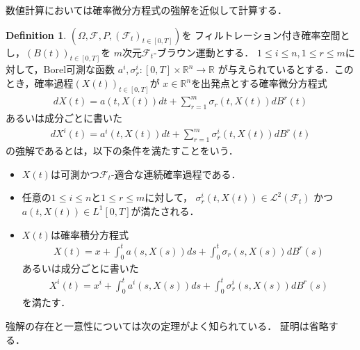 \documentclass[dvipdfmx,autodetect-engine]{jsarticle}
\theoremstyle{remark}
\theoremstyle{definition}
\newtheorem{definition}{Definition}[section]
\newcommand{\R}{\mathbb{R}}
\begin{document}
数値計算においては確率微分方程式の強解を近似して計算する．
\begin{definition}\label{strong_solution}
    $(\Omega,\mathcal{F},P,(\mathcal{F}_{t})_{t \in [0,T]})$を
    フィルトレーション付き確率空間とし，$(B(t))_{t \in [0,T]}$を
    $m$次元$\mathcal{F}_t$-ブラウン運動とする．
    $1\leq i\leq n, 1\leq r \leq m$に対して，Borel可測な函数
    $a^{i},\sigma_{r}^{i} \colon [0,T] \times \R^{n} \to \R$
    が与えられているとする．このとき，確率過程$(X(t))_{t \in [0,T]}$が
    $x \in \R^{n}$を出発点とする確率微分方程式
    \begin{align}
        dX(t) = a(t,X(t)) dt + \sum_{r=1}^{m} \sigma_{r}(t,X(t)) d B^{r}(t) \label{sde}
    \end{align}
    あるいは成分ごとに書いた
    \begin{align}
        dX^{i} (t) = a^{i}(t,X(t)) dt + \sum_{r=1}^{m} \sigma_{r}^{i}(t,X(t)) dB^{r}(t)
    \end{align}
    の強解であるとは，以下の条件を満たすことをいう．
    \begin{itemize}
        \item $X(t)$は可測かつ$\mathcal{F}_t$-適合な連続確率過程である．
        \item 任意の$1\leq i\leq n$と$1\leq r\leq m$に対して，
        $\sigma_{r}^{i}(t,X(t)) \in \mathcal{L}^2(\mathcal{F}_t)$
        かつ$a(t,X(t)) \in L^1[0,T]$が満たされる．
        \item $X(t)$は確率積分方程式
        \begin{align}
            X(t) = x + \int_{0}^{t} a(s,X(s))ds + \int_{0}^{t} \sigma_{r}(s,X(s))dB^{r}(s)
        \end{align}
        あるいは成分ごとに書いた
        \begin{align}
            X^{i}(t) = x^{i} + \int_{0}^{t} a^{i}(s,X(s))ds + \int_{0}^{t} \sigma_{r}^{i}(s,X(s))dB^{r}(s)
        \end{align}
        を満たす．
    \end{itemize}
\end{definition}


強解の存在と一意性については次の定理がよく知られている．
証明は省略する．
\end{document}

